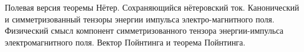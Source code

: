 \documentclass[__main__.tex]{subfiles}
\begin{document}
Полевая версия теоремы Нётер. Сохраняющийся нётеровский ток. Канонический и симметризованный тензоры энергии импульса электро-магнитного поля. Физический смысл компонент симметризованного тензора энергии-импульса электромагнитного поля. Вектор Пойнтинга и теорема Пойнтинга.\\ 

\end{document}
